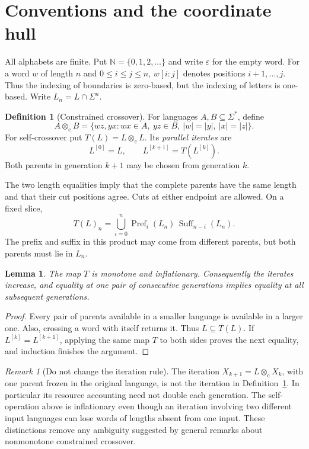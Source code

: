 \documentclass[11pt,letterpaper]{article}
\newtheorem{lemma}[theorem]{Lemma}
\theoremstyle{definition}
\newtheorem{definition}[theorem]{Definition}
\theoremstyle{remark}
\newtheorem{remark}[theorem]{Remark}
\newcommand{\N}{\mathbb N}
\newcommand{\eps}{\varepsilon}
\newcommand{\pref}{\operatorname{Pref}}
\newcommand{\suff}{\operatorname{Suff}}
\newcommand{\cut}{\otimes_{\mathrm c}}
\newcommand{\gen}[2]{#1^{[#2]}}
\begin{document}
\section{Conventions and the coordinate hull}\label{ccc:sec:definitions}

All alphabets are finite. Put $\N=\{0,1,2,\ldots\}$ and write $\eps$ for the
empty word. For a word $w$ of length $n$ and $0\leq i\leq j\leq n$,
$w[i:j]$ denotes positions $i+1,\ldots,j$. Thus the indexing of boundaries is
zero-based, but the indexing of letters is one-based. Write
$L_n=L\cap\Sigma^n$.

\begin{definition}[Constrained crossover]\label{ccc:def:crossover}
For languages $A,B\subseteq\Sigma^*$, define
\[
 A\cut B=\{wz,yx:wx\in A,\ yz\in B,\ |w|=|y|,\ |x|=|z|\}.
\]
For self-crossover put $T(L)=L\cut L$. Its \emph{parallel iterates} are
\[
 \gen L0=L,\qquad \gen L{k+1}=T(\gen Lk).
\]
Both parents in generation $k+1$ may be chosen from generation $k$.
\end{definition}

The two length equalities imply that the complete parents have the same
length and that their cut positions agree. Cuts at either endpoint are
allowed. On a fixed slice,
\begin{equation}
 T(L)_n=\bigcup_{i=0}^{n}\pref_i(L_n)\,\suff_{n-i}(L_n).
 \label{ccc:eq:slicecrossover}
\end{equation}
The prefix and suffix in this product may come from different parents, but
both parents must lie in $L_n$.

\begin{lemma}\label{ccc:lem:monotone}
The map $T$ is monotone and inflationary. Consequently the iterates increase,
and equality at one pair of consecutive generations implies equality at all
subsequent generations.
\end{lemma}
\begin{proof}
Every pair of parents available in a smaller language is available in a
larger one. Also, crossing a word with itself returns it. Thus
$L\subseteq T(L)$. If $\gen Lk=\gen L{k+1}$, applying the same map $T$ to both
sides proves the next equality, and induction finishes the argument.
\end{proof}

\begin{remark}[Do not change the iteration rule]
The iteration $X_{k+1}=L\cut X_k$, with one parent frozen in the original
language, is not the iteration in Definition~\ref{ccc:def:crossover}. In
particular its resource accounting need not double each generation. The
self-operation above is inflationary even though an iteration involving two
different input languages can lose words of lengths absent from one input.
These distinctions remove any ambiguity suggested by general remarks about
nonmonotone constrained crossover.
\end{remark}
\end{document}
